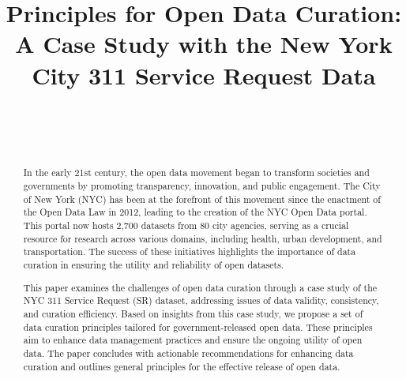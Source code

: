 \documentclass[linenumber]{jdsart}
\begin{document}
\begin{frontmatter}
  
\title{Principles for Open Data Curation: A Case Study with the New
York City 311 Service Request Data}

\author[1]{~}
\author[2]{~}
\address[1]{, }
\address[2]{Department of Statistics,
  , }



 \tableofcontents %
 \listoffigures %
 \listoftables %


\begin{abstract}
In the early 21st century, the open data movement began to transform 
societies and governments by promoting transparency,
innovation, and public engagement. The City of New York (NYC) has been at
the forefront of this movement since the enactment of the Open 
Data Law in 2012, leading to the creation of the NYC Open Data
portal. This portal now hosts 2,700 datasets from 80 city agencies,
serving as a crucial resource for research across various domains, 
including health, urban development, and transportation. The 
success of these initiatives highlights the importance of data 
curation in ensuring the utility and reliability of open datasets.


This paper examines the challenges of open data curation through a
case study of the NYC 311 Service Request (SR) dataset, addressing issues 
of data validity, consistency, and curation efficiency. Based on 
insights from this case study, we propose a set of data curation 
principles tailored for government-released open data. These principles 
aim to enhance data management practices and ensure 
the ongoing utility of open data. The paper concludes with 
actionable recommendations for enhancing data curation and outlines
general principles for the effective release of open data.

\end{abstract}

\begin{keywords}
\end{keywords}

\end{frontmatter}
\end{document}
